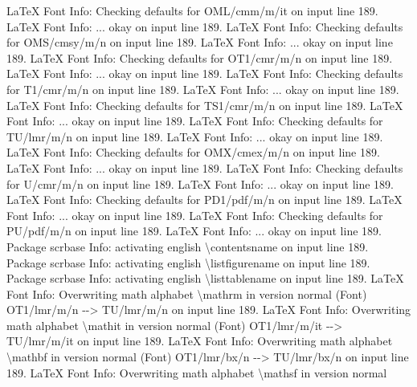 \documentclass[
  letterpaper,
  DIV=11,
  numbers=noendperiod]{scrartcl}
\newenvironment{Shaded}{\begin{snugshade}}{\end{snugshade}}
\newcommand{\NormalTok}[1]{\textcolor[rgb]{0.00,0.23,0.31}{#1}}
\begin{document}
\begin{Shaded}
\begin{Highlighting}[]
\NormalTok{LaTeX Font Info:    Checking defaults for OML/cmm/m/it on input line 189.}
\NormalTok{LaTeX Font Info:    ... okay on input line 189.}
\NormalTok{LaTeX Font Info:    Checking defaults for OMS/cmsy/m/n on input line 189.}
\NormalTok{LaTeX Font Info:    ... okay on input line 189.}
\NormalTok{LaTeX Font Info:    Checking defaults for OT1/cmr/m/n on input line 189.}
\NormalTok{LaTeX Font Info:    ... okay on input line 189.}
\NormalTok{LaTeX Font Info:    Checking defaults for T1/cmr/m/n on input line 189.}
\NormalTok{LaTeX Font Info:    ... okay on input line 189.}
\NormalTok{LaTeX Font Info:    Checking defaults for TS1/cmr/m/n on input line 189.}
\NormalTok{LaTeX Font Info:    ... okay on input line 189.}
\NormalTok{LaTeX Font Info:    Checking defaults for TU/lmr/m/n on input line 189.}
\NormalTok{LaTeX Font Info:    ... okay on input line 189.}
\NormalTok{LaTeX Font Info:    Checking defaults for OMX/cmex/m/n on input line 189.}
\NormalTok{LaTeX Font Info:    ... okay on input line 189.}
\NormalTok{LaTeX Font Info:    Checking defaults for U/cmr/m/n on input line 189.}
\NormalTok{LaTeX Font Info:    ... okay on input line 189.}
\NormalTok{LaTeX Font Info:    Checking defaults for PD1/pdf/m/n on input line 189.}
\NormalTok{LaTeX Font Info:    ... okay on input line 189.}
\NormalTok{LaTeX Font Info:    Checking defaults for PU/pdf/m/n on input line 189.}
\NormalTok{LaTeX Font Info:    ... okay on input line 189.}
\NormalTok{Package scrbase Info: activating english \textbackslash{}contentsname on input line 189.}
\NormalTok{Package scrbase Info: activating english \textbackslash{}listfigurename on input line 189.}
\NormalTok{Package scrbase Info: activating english \textbackslash{}listtablename on input line 189.}
\NormalTok{LaTeX Font Info:    Overwriting math alphabet \textasciigrave{}\textbackslash{}mathrm\textquotesingle{} in version \textasciigrave{}normal\textquotesingle{}}
\NormalTok{(Font)                  OT1/lmr/m/n {-}{-}\textgreater{} TU/lmr/m/n on input line 189.}
\NormalTok{LaTeX Font Info:    Overwriting math alphabet \textasciigrave{}\textbackslash{}mathit\textquotesingle{} in version \textasciigrave{}normal\textquotesingle{}}
\NormalTok{(Font)                  OT1/lmr/m/it {-}{-}\textgreater{} TU/lmr/m/it on input line 189.}
\NormalTok{LaTeX Font Info:    Overwriting math alphabet \textasciigrave{}\textbackslash{}mathbf\textquotesingle{} in version \textasciigrave{}normal\textquotesingle{}}
\NormalTok{(Font)                  OT1/lmr/bx/n {-}{-}\textgreater{} TU/lmr/bx/n on input line 189.}
\NormalTok{LaTeX Font Info:    Overwriting math alphabet \textasciigrave{}\textbackslash{}mathsf\textquotesingle{} in version \textasciigrave{}normal\textquotesingle{}}

\end{Highlighting}
\end{Shaded}
\end{document}

